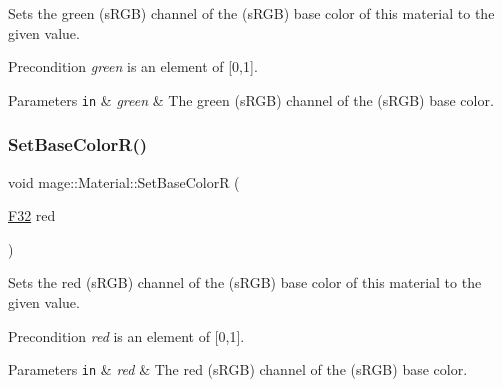 Sets the green (s\+R\+GB) channel of the (s\+R\+GB) base color of this material to the given value.

\begin{DoxyPrecond}{Precondition}
{\itshape green} is an element of \mbox{[}0,1\mbox{]}. 
\end{DoxyPrecond}

\begin{DoxyParams}[1]{Parameters}
\mbox{\tt in}  & {\em green} & The green (s\+R\+GB) channel of the (s\+R\+GB) base color. \\
\hline
\end{DoxyParams}
\hypertarget{structmage_1_1_material_ad576d2d4a9530cce224ad5f61cacc4be}{}\label{structmage_1_1_material_ad576d2d4a9530cce224ad5f61cacc4be} 
\subsubsection{\texorpdfstring{Set\+Base\+Color\+R()}{SetBaseColorR()}}
{\footnotesize\ttfamily void mage\+::\+Material\+::\+Set\+Base\+ColorR (\begin{DoxyParamCaption}\item[{\hyperlink{namespacemage_aa97e833b45f06d60a0a9c4fc22ae02c0}{F32}}]{red }\end{DoxyParamCaption})\hspace{0.3cm}{\ttfamily [noexcept]}}

Sets the red (s\+R\+GB) channel of the (s\+R\+GB) base color of this material to the given value.

\begin{DoxyPrecond}{Precondition}
{\itshape red} is an element of \mbox{[}0,1\mbox{]}. 
\end{DoxyPrecond}

\begin{DoxyParams}[1]{Parameters}
\mbox{\tt in}  & {\em red} & The red (s\+R\+GB) channel of the (s\+R\+GB) base color. \\
\hline
\end{DoxyParams}
\hypertarget{structmage_1_1_material_add2b411290e7ec1425141ee11c16e210}{}\label{structmage_1_1_material_add2b411290e7ec1425141ee11c16e210} 
